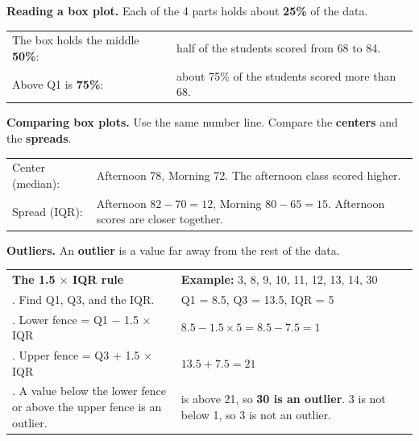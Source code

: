 \documentclass[11pt]{article}
\begin{document}

\textbf{Reading a box plot.} Each of the 4 parts holds about \textbf{25\%} of the data.

\begin{center}\end{center}

\begin{tabular}{@{}ll}
The box holds the middle \textbf{50\%}: & half of the students scored from 68 to 84.\\
Above Q1 is \textbf{75\%}: & about 75\% of the students scored more than 68.\\
\end{tabular}

\vspace{0.6em}
\textbf{Comparing box plots.} Use the same number line. Compare the \textbf{centers} and the \textbf{spreads}.

\begin{center}\end{center}

\begin{tabular}{@{}l>{\raggedright\arraybackslash}p{5.5in}}
Center (median): & Afternoon 78, Morning 72. The afternoon class scored higher.\\
Spread (IQR): & Afternoon $82 - 70 = 12$, Morning $80 - 65 = 15$. Afternoon scores are closer together.\\
\end{tabular}

\vspace{0.8em}
\textbf{Outliers.} An \textbf{outlier} is a value far away from the rest of the data.

\vspace{0.3em}
\renewcommand{\arraystretch}{1.3}
\begin{tabular}{|>{\raggedright\arraybackslash}p{3.1in}|>{\raggedright\arraybackslash}p{3.4in}|}
\hline
\textbf{The 1.5 $\times$ IQR rule} & \textbf{Example:} 3, 8, 9, 10, 11, 12, 13, 14, 30 \\
1. Find Q1, Q3, and the IQR. &
Q1 = 8.5, \; Q3 = 13.5, \; IQR = 5 \\
2. Lower fence = Q1 $-$ 1.5 $\times$ IQR &
$8.5 - 1.5 \times 5 = 8.5 - 7.5 = 1$ \\
3. Upper fence = Q3 + 1.5 $\times$ IQR &
$13.5 + 7.5 = 21$ \\
4. A value below the lower fence or above the upper fence is an outlier. &
30 is above 21, so \textbf{30 is an outlier}. 3 is not below 1, so 3 is not an outlier. \\
\hline
\end{tabular}
\end{document}
